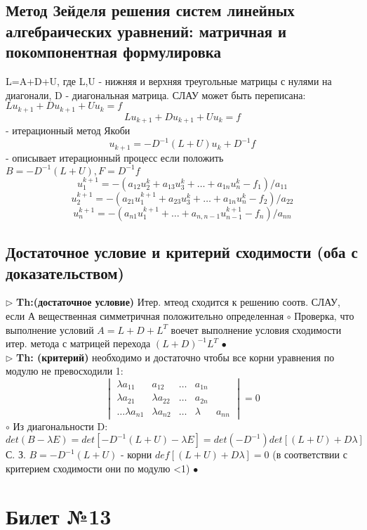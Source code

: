 \documentclass[a4paper]{article}
\begin{document}
\subsection{Метод Зейделя решения систем линейных алгебраических уравнений: матричная и покомпонентная формулировка}
L=A+D+U, где L,U - нижняя и верхняя треугольные матрицы с нулями на диагонали, D - диагональная матрица. СЛАУ может быть переписана:
$Lu_{k+1} + Du_{k+1} + Uu_k = f $
$$ Lu_{k+1} + Du_{k+1} + Uu_k =f$$ - итерационный метод Якоби
$$ u_{k+1} = -D^{-1}(L+U)u_k + D^{-1}f$$ - описывает итерационный процесс если положить $ B=-D^{-1}(L+U), F=D^{-1}f$
$$ u_1^{k+1}=-(a_{12}u_2^k + a_{13}u_3^k + \ldots + a_{1n}u_n^k - f_1)/a_{11}$$
$$ u_2^{k+1}=-(a_{21}u_1^{k+1} + a_{23}u_3^k + \ldots + a_{1n}u_n^k - f_2)/a_{22}$$
$$ u_n^{k+1}=-(a_{n1}u_1^{k+1} + \ldots + a_{n,n-1}u_{n-1}^{k+1} - f_n)/a_{nn} $$
\subsection{Достаточное условие и критерий сходимости (оба с доказательством)}
$\triangleright$ \textbf{Th:(достаточное условие)} Итер. мтеод сходится к решению соотв. СЛАУ, если А вещественная симметричная положительно определенная
	$\circ$ 
		Проверка, что выполнение условий $ A = L + D + L^{T}$ воечет выполнение условия сходимости итер. метода с матрицей перехода $(L+D)^{-1}L^{T}$
	$\bullet$ \\

$\triangleright$ \textbf{Th: (критерий)} необходимо и достаточно чтобы все корни уравнения по модулю не превосходили 1:
$$ \begin{vmatrix} 
\lambda a_{11} & a_{12} & \ldots & a_{1n} \\
\lambda a_{21} & \lambda a_{22} & \ldots & a_{2n} \\
\ldots
\lambda a_{n1} & \lambda a_{n2} & \ldots & \lambda & a_{nn}
\end{vmatrix} = 0 $$
	$\circ$ 
		Из диагональности D:
		$$ det(B-\lambda E) = det[-D^{-1}(L+U) - \lambda E] = det(-D^{-1}) det[(L+U) + D\lambda] $$
		С. З. $B=-D^{-1}(L+U)$ - корни $def[(L+U)+D\lambda]=0$ (в соответствии с критерием сходимости они по модулю <1)
	$\bullet$

\section{Билет №13}
\end{document}
